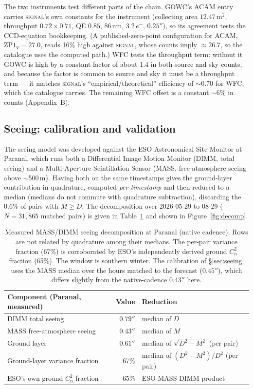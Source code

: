 \documentclass[11pt]{article}
\begin{document}
The two instruments test different parts of the chain. GOWC's ACAM entry carries
\textsc{signal}'s own constants for the instrument (collecting area $12.47$\,m$^2$,
throughput $0.72\times0.71$, QE $0.85$, 86\,nm, $3.2\,e^-$, $0.25''$), so its
agreement tests the CCD-equation bookkeeping. (A published-zero-point
configuration for ACAM, $\mathrm{ZP1}_V=27.0$, reads 16\% high against
\textsc{signal}, whose counts imply $\approx26.7$, so the catalogue uses the computed
path.) WFC tests the throughput term: without it GOWC is high by a constant factor of
about 1.4 in both source and sky counts, and because the factor is common to source
and sky it must be a throughput term --- it matches \textsc{signal}'s
``empirical/theoretical'' efficiency of $\sim$0.70 for WFC, which the catalogue
carries. The remaining WFC offset is a constant $\sim$6\% in counts (Appendix~B).

\subsection{Seeing: calibration and validation}
\label{sec:dimm}
The seeing model was developed against the ESO Astronomical Site Monitor at Paranal,
which runs both a Differential Image Motion Monitor (DIMM, total seeing) and a
Multi-Aperture Scintillation Sensor (MASS, free-atmosphere seeing above
$\sim$500\,m). Having both on the same timestamps gives the ground-layer contribution
in quadrature, computed \emph{per timestamp} and then reduced to a median (medians do
not commute with quadrature subtraction), discarding the 0.6\% of pairs with
$M \ge D$. The decomposition over 2026-05-29 to 08-29 ($N = 31{,}865$ matched pairs)
is given in Table~\ref{tab:decomp} and shown in Figure~\ref{fig:decomp}.

\begin{table}[h!]
\centering
\begin{tabular}{l r l}
\hline
\textbf{Component (Paranal, measured)} & \textbf{Value} & \textbf{Reduction} \\
\hline
DIMM total seeing              & $0.79''$ & median of $D$ \\
MASS free-atmosphere seeing    & $0.43''$ & median of $M$ \\
Ground layer                   & $0.61''$ & median of $\sqrt{D^2-M^2}$ (per pair) \\
Ground-layer variance fraction & 67\%     & median of $(D^2-M^2)/D^2$ (per pair) \\
ESO's own ground $C_n^2$ fraction & 65\%  & ESO MASS-DIMM product \\
\hline
\end{tabular}
\caption{Measured MASS/DIMM seeing decomposition at Paranal (native cadence). Rows
are not related by quadrature among their medians. The per-pair variance fraction
(67\%) is corroborated by ESO's independently derived ground $C_n^2$ fraction (65\%).
The window is southern winter. The calibration of \S\ref{sec:seeing} uses the MASS
median over the hours matched to the forecast ($0.45''$), which differs slightly from
the native-cadence $0.43''$ here.}
\label{tab:decomp}
\end{table}
\end{document}
